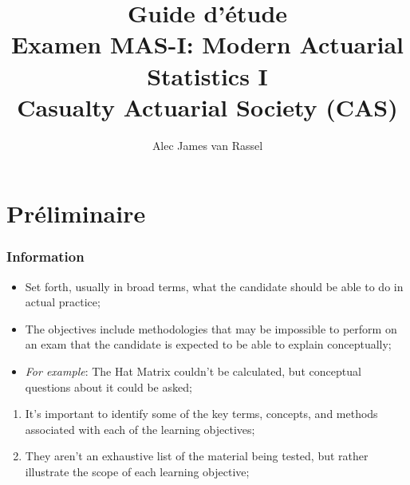 \documentclass[12pt, titlepage, french]{report}
\title{
	Guide d'étude	\\
	\large Examen MAS-I: Modern Actuarial Statistics I\\
	Casualty Actuarial Society (CAS)}
\date{}
\author{Alec James van Rassel}
\begin{document}
\maketitle

\tableofcontents

\clearpage

\part*{Préliminaire}

\section{Information}

\begin{distributions}[Objectives]
\begin{itemize}
	\item	Set forth, usually in broad terms, what the candidate should be able to do in actual practice;
	\item	The objectives include methodologies that may be impossible to perform on an exam that the candidate is expected to be able to explain conceptually;
	\item	\textit{For example}: The Hat Matrix couldn't be calculated, but conceptual questions about it could be asked;
\end{itemize}
\end{distributions}

\begin{outcomes}
\begin{enumerate}
	\item	It's important to identify some of the key terms, concepts, and methods associated with each of the learning objectives;
	\item	They aren't an exhaustive list of the material being tested, but rather illustrate the scope of each learning objective;
\end{enumerate}
\end{outcomes}
\end{document}
